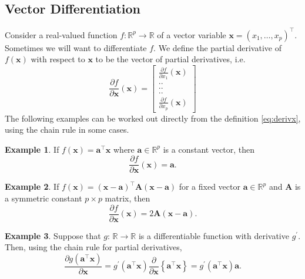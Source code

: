 \documentclass[
]{book}
\theoremstyle{definition}
\theoremstyle{definition}
\newtheorem{example}{Example}[chapter]
\theoremstyle{definition}
\theoremstyle{definition}
\theoremstyle{remark}
\begin{document}
\subsection{Vector Differentiation}\label{vectordiff}

Consider a real-valued function \(f: \mathbb{R}^p \rightarrow \mathbb{R}\) of a vector variable \(\mathbf x=(x_1, \ldots , x_p)^\top\). Sometimes we will want to differentiate \(f\). We define the partial derivative of \(f(\mathbf x)\) with respect to \(\mathbf x\) to be
the vector of partial derivatives, i.e.
\begin{equation}
\frac{\partial f}{\partial \mathbf x}(\mathbf x)=\left [ \begin{array}{c} \frac{\partial f}{\partial x_1}(\mathbf x)\\
 ..\\
 ..\\
 ..\\
 \frac{\partial f}{\partial x_p}(\mathbf x)
\end{array} \right ]
\label{eq:derivx}
\end{equation}
The following examples can be worked out directly from the definition \eqref{eq:derivx}, using the chain rule in some cases.

\begin{example}
\protect\hypertarget{exm:calc1}{}\label{exm:calc1}If \(f(\mathbf x)=\mathbf a^\top \mathbf x\) where \(\mathbf a\in \mathbb{R}^p\) is a constant vector, then
\[
\frac{\partial f}{\partial \mathbf x}(\mathbf x)=\mathbf a.
\]
\end{example}

\begin{example}
\protect\hypertarget{exm:calc2}{}\label{exm:calc2}If \(f(\mathbf x)=(\mathbf x-\mathbf a)^\top \mathbf A(\mathbf x-\mathbf a)\) for a fixed vector \(\mathbf a\in \mathbb{R}^p\)
and \(\mathbf A\) is a symmetric constant \(p \times p\) matrix, then
\[
\frac{\partial f}{\partial \mathbf x}(\mathbf x)=2\mathbf A(\mathbf x-\mathbf a).
\]
\end{example}

\begin{example}
\protect\hypertarget{exm:calc3}{}\label{exm:calc3}Suppose that \(g: \, \mathbb{R} \rightarrow \mathbb{R}\) is a differentiable function with derivative \(g^\prime\). Then, using the chain rule for partial derivatives,
\[
\frac{\partial g(\mathbf a^\top \mathbf x)}{\partial \mathbf x}=g^{\prime}(\mathbf a^\top\mathbf x)\frac{\partial}{\partial \mathbf x}\left \{\mathbf a^\top \mathbf x\right \}=g^{\prime}(\mathbf a^\top\mathbf x) \mathbf a.
\]
\end{example}
\end{document}
